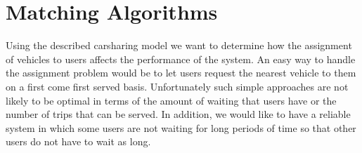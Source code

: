 \documentclass[letterpaper]{article}
\begin{document}
\section{Matching Algorithms}

Using the described carsharing model we want to determine how the assignment of vehicles to users affects the performance of the system. An easy way to handle the assignment problem would be to let users request the nearest vehicle to them on a first come first served basis. Unfortunately such simple approaches are not likely to be optimal in terms of the amount of waiting that users have or the number of trips that can be served. In addition, we would like to have a reliable system in which some users are not waiting for long periods of time so that other users do not have to wait as long.
\end{document}
